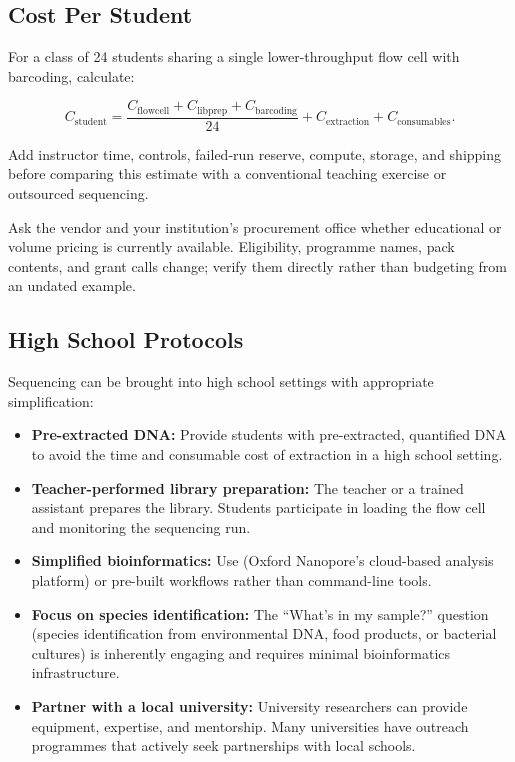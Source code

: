 \subsection{Cost Per Student}
\label{subsec:accessible:coststudent}

For a class of 24 students sharing a single lower-throughput flow cell with barcoding, calculate:

\begin{equation}
C_{\text{student}} = \frac{C_{\text{flowcell}} + C_{\text{libprep}} + C_{\text{barcoding}}}{24} + C_{\text{extraction}} + C_{\text{consumables}}.
\end{equation}

Add instructor time, controls, failed-run reserve, compute, storage, and shipping before comparing this estimate with a conventional teaching exercise or outsourced sequencing.

\begin{tipbox}[title={Oxford Nanopore Educational Discounts}]
Ask the vendor and your institution's procurement office whether educational or volume pricing is currently available. Eligibility, programme names, pack contents, and grant calls change; verify them directly rather than budgeting from an undated example.
\end{tipbox}

\subsection{High School Protocols}
\label{subsec:accessible:highschool}

Sequencing can be brought into high school settings with appropriate simplification:

\begin{itemize}[itemsep=2pt]
  \item \textbf{Pre-extracted DNA:} Provide students with pre-extracted, quantified DNA to avoid the time and consumable cost of extraction in a high school setting.
  \item \textbf{Teacher-performed library preparation:} The teacher or a trained assistant prepares the library. Students participate in loading the flow cell and monitoring the sequencing run.
  \item \textbf{Simplified bioinformatics:} Use  (Oxford Nanopore's cloud-based analysis platform) or pre-built  workflows rather than command-line tools.
  \item \textbf{Focus on species identification:} The ``What's in my sample?'' question (species identification from environmental DNA, food products, or bacterial cultures) is inherently engaging and requires minimal bioinformatics infrastructure.
  \item \textbf{Partner with a local university:} University researchers can provide equipment, expertise, and mentorship. Many universities have outreach programmes that actively seek partnerships with local schools.
\end{itemize}

